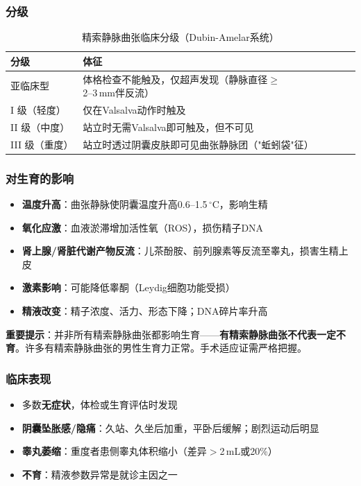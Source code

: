 \documentclass[12pt,a4paper,twoside]{ctexbook}
\begin{document}
\subsubsection{分级}

\begin{table}[htbp]
\centering
\caption{精索静脉曲张临床分级（Dubin-Amelar系统）}
\label{tab:varicocele_grade}
\begin{tabularx}{\textwidth}{@{}lX@{}}
    \toprule
    \textbf{分级} & \textbf{体征} \\
    \midrule
    亚临床型 & 体格检查不能触及，仅超声发现（静脉直径$\ge$2--3\,mm伴反流） \\
    I 级（轻度） & 仅在Valsalva动作时触及 \\
    II 级（中度） & 站立时无需Valsalva即可触及，但不可见 \\
    III 级（重度） & 站立时透过阴囊皮肤即可见曲张静脉团（"蚯蚓袋"征） \\
    \bottomrule
\end{tabularx}
\end{table}

\subsubsection{对生育的影响}

\begin{itemize}[leftmargin=2cm]
	\item \textbf{温度升高}：曲张静脉使阴囊温度升高0.6--1.5\,$^\circ$C，影响生精
	\item \textbf{氧化应激}：血液淤滞增加活性氧（ROS），损伤精子DNA
	\item \textbf{肾上腺/肾脏代谢产物反流}：儿茶酚胺、前列腺素等反流至睾丸，损害生精上皮
	\item \textbf{激素影响}：可能降低睾酮（Leydig细胞功能受损）
	\item \textbf{精液改变}：精子浓度、活力、形态下降；DNA碎片率升高
\end{itemize}

\textbf{重要提示}：并非所有精索静脉曲张都影响生育——\textbf{有精索静脉曲张不代表一定不育}。许多有精索静脉曲张的男性生育力正常。手术适应证需严格把握。

\subsubsection{临床表现}

\begin{itemize}[leftmargin=2cm]
	\item 多数\textbf{无症状}，体检或生育评估时发现
	\item \textbf{阴囊坠胀感/隐痛}：久站、久坐后加重，平卧后缓解；剧烈运动后明显
	\item \textbf{睾丸萎缩}：重度者患侧睾丸体积缩小（差异$>$2\,mL或20\%）
	\item \textbf{不育}：精液参数异常是就诊主因之一
\end{itemize}
\end{document}
